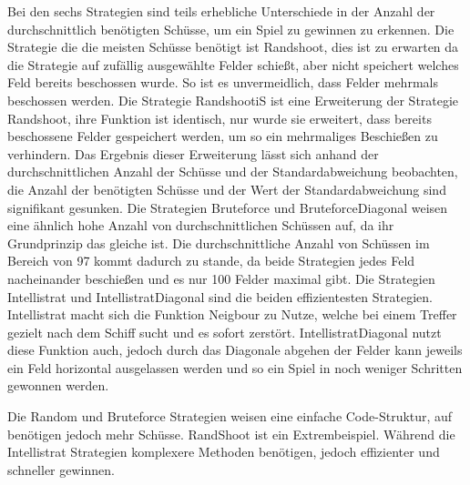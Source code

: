 Bei den sechs Strategien sind teils erhebliche Unterschiede in der Anzahl der durchschnittlich benötigten Schüsse, um ein Spiel zu gewinnen zu erkennen. Die Strategie die die meisten 
Schüsse benötigt ist Randshoot, dies ist zu erwarten da die Strategie auf zufällig ausgewählte Felder schießt, aber nicht speichert welches Feld bereits beschossen wurde. So ist es  unvermeidlich, dass Felder mehrmals beschossen werden. Die Strategie RandshootiS ist eine Erweiterung der Strategie Randshoot, ihre Funktion ist identisch, nur wurde sie 
erweitert, dass bereits beschossene Felder gespeichert werden, um so ein mehrmaliges Beschießen zu verhindern. Das Ergebnis dieser Erweiterung lässt sich anhand der durchschnittlichen 
Anzahl der Schüsse und der Standardabweichung beobachten, die Anzahl der benötigten Schüsse und der Wert der Standardabweichung sind signifikant gesunken. Die Strategien Bruteforce 
und BruteforceDiagonal weisen eine ähnlich hohe Anzahl von durchschnittlichen Schüssen auf, da ihr Grundprinzip das gleiche ist. Die durchschnittliche Anzahl von Schüssen im Bereich 
von 97 kommt dadurch zu stande, da beide Strategien jedes Feld nacheinander beschießen und es nur 100 Felder maximal gibt. Die Strategien Intellistrat und IntellistratDiagonal sind 
die beiden effizientesten Strategien. Intellistrat macht sich die Funktion Neigbour zu Nutze, welche bei einem Treffer gezielt nach dem Schiff sucht und es sofort zerstört. 
IntellistratDiagonal nutzt diese Funktion auch, jedoch durch das Diagonale abgehen der Felder kann jeweils ein Feld horizontal ausgelassen werden und so ein Spiel in noch weniger 
Schritten gewonnen werden.

Die Random und Bruteforce Strategien weisen eine einfache Code-Struktur, auf benötigen jedoch mehr Schüsse. RandShoot ist ein Extrembeispiel. Während die Intellistrat Strategien 
komplexere Methoden benötigen, jedoch effizienter und schneller gewinnen.
